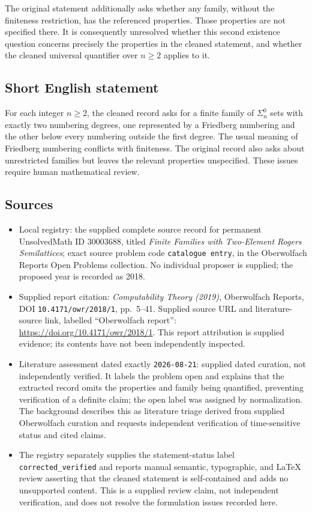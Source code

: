 \documentclass[11pt]{article}
\begin{document}
The original statement additionally asks whether any family, without the finiteness restriction, has the referenced properties. Those properties are not specified there. It is consequently unresolved whether this second existence question concerns precisely the properties in the cleaned statement, and whether the cleaned universal quantifier over \(n\geq2\) applies to it.
\subsection{Short English statement}
For each integer \(n\geq2\), the cleaned record asks for a finite family of \(\Sigma_n^0\) sets with exactly two numbering degrees, one represented by a Friedberg numbering and the other below every numbering outside the first degree. The usual meaning of Friedberg numbering conflicts with finiteness. The original record also asks about unrestricted families but leaves the relevant properties unspecified. These issues require human mathematical review.
\subsection{Sources}
\begin{itemize}
\item Local registry: the supplied complete source record for permanent UnsolvedMath ID \(30003688\), titled \emph{Finite Families with Two-Element Rogers Semilattices}; exact source problem code \texttt{catalogue entry}, in the Oberwolfach Reports Open Problems collection. No individual proposer is supplied; the proposed year is recorded as 2018.
\item Supplied report citation: \emph{Computability Theory (2019)}, Oberwolfach Reports, DOI \texttt{10.4171/owr/2018/1}, pp.\ 5--41. Supplied source URL and literature-source link, labelled ``Oberwolfach report'': \url{https://doi.org/10.4171/owr/2018/1}. This report attribution is supplied evidence; its contents have not been independently inspected.
\item Literature assessment dated exactly \texttt{2026-08-21}: supplied dated curation, not independently verified. It labels the problem open and explains that the extracted record omits the properties and family being quantified, preventing verification of a definite claim; the open label was assigned by normalization. The background describes this as literature triage derived from supplied Oberwolfach curation and requests independent verification of time-sensitive status and cited claims.
\item The registry separately supplies the statement-status label \texttt{corrected\_verified} and reports manual semantic, typographic, and LaTeX review asserting that the cleaned statement is self-contained and adds no unsupported content. This is a supplied review claim, not independent verification, and does not resolve the formulation issues recorded here.
\end{itemize}
\end{document}
